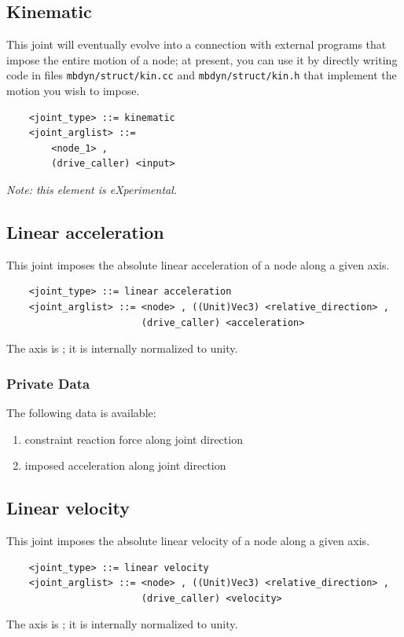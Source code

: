 


\subsection{Kinematic}
This joint will eventually evolve into a connection with external programs
that impose the entire motion of a node; at present, you can use it
by directly writing code in files \verb;mbdyn/struct/kin.cc; and
\verb;mbdyn/struct/kin.h; that implement the motion you wish to impose.
\begin{verbatim}
    <joint_type> ::= kinematic
    <joint_arglist> ::= 
        <node_1> ,
        (drive_caller) <input>
\end{verbatim}
\emph{Note: this element is eXperimental.}

\subsection{Linear acceleration}
This joint imposes the absolute linear acceleration of a node
along a given axis.
\begin{verbatim}
    <joint_type> ::= linear acceleration
    <joint_arglist> ::= <node> , ((Unit)Vec3) <relative_direction> , 
                        (drive_caller) <acceleration>
\end{verbatim}
The axis is ; it is internally normalized to unity.

\subsubsection{Private Data}
The following data is available:
\begin{enumerate}
\item {} constraint reaction force along joint direction
\item {} imposed acceleration along joint direction
\end{enumerate}

\subsection{Linear velocity}
This joint imposes the absolute linear velocity of a node
along a given axis.
\begin{verbatim}
    <joint_type> ::= linear velocity
    <joint_arglist> ::= <node> , ((Unit)Vec3) <relative_direction> , 
                        (drive_caller) <velocity>
\end{verbatim}
The axis is ; it is internally normalized to unity.

